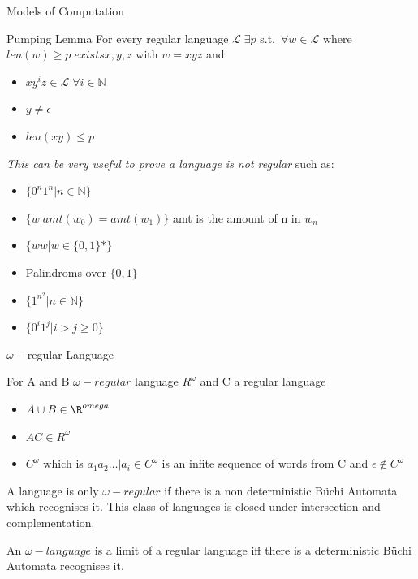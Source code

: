 \documentclass[12pt, letterpaper]{article}
\begin{document}
\begin{section}{Models of Computation}
\begin{subsection}{Pumping Lemma}
    For every regular language \(\mathscr{L} \; \exists p\) s.t.\
    \(\forall w \in \mathscr{L}\) where \(len(w) \geq p \;
    exists x, y, z\) with \(w = xyz\) and
    \begin{itemize}
      \item \(xy^{i}z \in \mathscr{L} \; \forall i \in \mathbb{N}\)
      \item \(y \neq \epsilon\)
      \item \(len(xy) \leq p\)
    \end{itemize}
    \emph{This can be very useful to prove a language is not regular} such as:
    \begin{itemize}
      \item \(\{ 0^{n}1^{n} | n \in \mathbb{N} \}\)
      \item \(\{ w | amt(w_{0}) = amt(w_{1})\}\) amt is the amount of n in \(w_{n}\)
      \item \(\{ ww | w\in \{ 0, 1 \}* \}\)
      \item Palindroms over \(\{ 0, 1 \}\)
      \item \(\{ 1^{n^{2}} | n \in \mathbb{N} \}\)
      \item \(\{ 0^{i} 1^{j} | i > j \geq 0 \}\)
    \end{itemize}

  \end{subsection}

  \begin{subsection}{\(\omega-\)regular Language}

    For A and B \(\omega-regular\) language \(R^{\omega}\) and C a regular
    language
    \begin{itemize}
      \item \(A \cup B \in \R^{omega}\)
      \item \(AC \in R^{\omega}\)
      \item \(C^{\omega}\) which is \(a_{1}a_{2} \dots | a_{i} \in C^{\omega}\)
      is an infite sequence of words from C and \(\epsilon \notin C^{\omega}\)
    \end{itemize}
    A language is only \(\omega-regular\) if there is a non deterministic
    B\"uchi Automata which recognises it. This class of languages is closed
    under intersection and complementation.

    An \(\omega-language\) is a limit of a regular language iff there is a
    deterministic B\"uchi Automata recognises it.

  \end{subsection}


\end{section}
\end{document}

